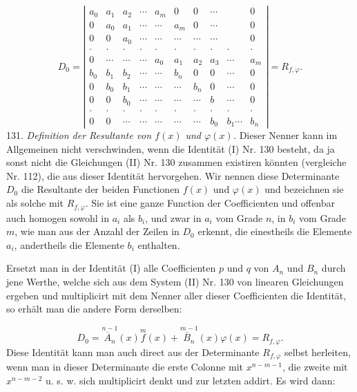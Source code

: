 \[
D_0 = \left|
\begin{array}{cccccccccc}
a_0 & a_1 & a_2 & \cdots & a_m & 0 & 0 & \cdots & & 0\\
0 & a_0 & a_1 & \cdots & \cdots & a_m & 0 & \cdots & & 0\\
0 & 0 & a_0 & \cdots & \cdots & \cdots & \cdots & \cdots & & 0\\
\cdot & \cdot & \cdot & \cdot & \cdot & \cdot & \cdot & \cdot & \cdot & \cdot\\
0 & \cdots & \cdots & \cdots & a_0 & a_1 & a_2 & a_3 & \cdots & a_m\\
b_0 & b_1 & b_2 & \cdots & \cdots & b_n & 0 & 0 & \cdots & 0\\
0 & b_0 & b_1 & \cdots & \cdots & \cdots & b_n & 0 & \cdots & 0\\
0 & 0 & b_0 & \cdots & \cdots & \cdots & \cdots & b & \cdots & 0\\
\cdot & \cdot & \cdot & \cdot & \cdot & \cdot & \cdot & \cdot & \cdot & \cdot\\
0 & 0 & \cdots & \cdots & \cdots & \cdots & \cdots & b_0 & b_1 \cdots & b_n
\end{array}
\right| = R_{f,\varphi}.
\]
131. \textit{Definition der Resultante von $f(x)$ und $\varphi(x)$.} Dieser Nenner
kann im Allgemeinen nicht verschwinden, wenn die Identität (I) Nr. 130
besteht, da ja sonst nicht die Gleichungen (II) Nr. 130 zusammen
existiren könnten (vergleiche Nr. 112), die aus dieser Identität hervor\-gehen. Wir nennen diese Determinante $D_0$ \glqq die Resultante\grqq{} der beiden
Functionen $f(x)$ und $\varphi(x)$ und bezeichnen sie als solche mit $R_{f,\varphi}$.
Sie ist eine ganze Function der Coefficienten und offenbar auch homogen
sowohl in $a_i$ als $b_i$, und zwar in $a_i$ vom Grade $n$, in $b_i$ vom Grade $m$,
wie man aus der Anzahl der Zeilen in $D_0$ erkennt, die einestheils die
Elemente $a_i$, andertheils die Elemente $b_i$ enthalten.

Ersetzt man in der Identität (I) alle Coefficienten $p$ und $q$ von
$A_n$ und $B_n$ durch jene Werthe, welche sich aus dem System (II) Nr. 130
von linearen Gleichungen ergeben und multiplicirt mit dem Nenner
aller dieser Coefficienten die Identität, so erhält man die andere Form
derselben:

\[
D_0 = \overset{n-1}{\overline{A}_n}(x)\overset{m}{f}(x) + \overset{m-1}{\overline{B}_n}(x)\varphi(x) = R_{f,\varphi}.
\]
Diese Identität kann man auch direct aus der Determinante $R_{f,\varphi}$ selbst
herleiten, wenn man in dieser Determinante die erste Colonne mit
$x^{n-m-1}$, die zweite mit $x^{n-m-2}$ u. s. w. sich multiplicirt denkt und
zur letzten addirt. Es wird dann:

